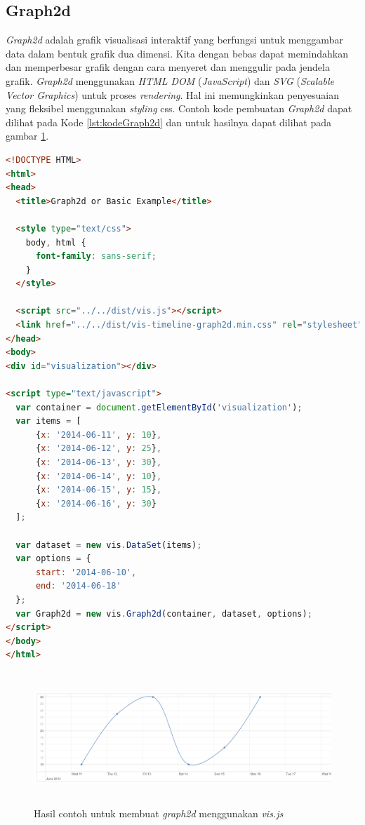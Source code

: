 \subsection{Graph2d}
\textit{Graph2d} adalah grafik visualisasi interaktif yang berfungsi untuk menggambar data dalam bentuk grafik dua dimensi. Kita dengan bebas dapat memindahkan dan memperbesar grafik dengan cara menyeret dan menggulir pada jendela grafik. \textit{Graph2d} menggunakan \textit{HTML DOM} (\textit{JavaScript}) dan \textit{SVG} (\textit{Scalable Vector Graphics}) untuk proses \textit{rendering}. Hal ini memungkinkan penyesuaian yang fleksibel menggunakan \textit{styling} css. Contoh kode pembuatan \textit{Graph2d} dapat dilihat pada Kode \ref{lst:kodeGraph2d} dan untuk hasilnya dapat dilihat pada gambar \ref{fig:gambarHasilGraph2d}.

\begin{lstlisting}[language=HTML, caption=Contoh kode untuk membuat \textit{graph2d} menggunakan \textit{vis.js}\label{lst:kodeGraph2d}]
<!DOCTYPE HTML>
<html>
<head>
  <title>Graph2d or Basic Example</title>

  <style type="text/css">
    body, html {
      font-family: sans-serif;
    }
  </style>

  <script src="../../dist/vis.js"></script>
  <link href="../../dist/vis-timeline-graph2d.min.css" rel="stylesheet" type="text/css" />
</head>
<body>
<div id="visualization"></div>

<script type="text/javascript">
  var container = document.getElementById('visualization');
  var items = [
      {x: '2014-06-11', y: 10},
      {x: '2014-06-12', y: 25},
      {x: '2014-06-13', y: 30},
      {x: '2014-06-14', y: 10},
      {x: '2014-06-15', y: 15},
      {x: '2014-06-16', y: 30}
  ];

  var dataset = new vis.DataSet(items);
  var options = {
      start: '2014-06-10',
      end: '2014-06-18'
  };
  var Graph2d = new vis.Graph2d(container, dataset, options);
</script>
</body>
</html>
\end{lstlisting}

\begin{figure}[H]
    \centering
    \includegraphics[width=16.5cm, height=5cm]{Gambar/hasilGraph2d.png}
    \caption{Hasil contoh untuk membuat \textit{graph2d} menggunakan \textit{vis.js}}
    \label{fig:gambarHasilGraph2d}
\end{figure}

